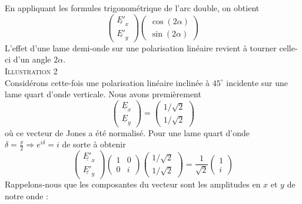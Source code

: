 		En appliquant les formules trigonométrique de l'arc double, on obtient
		\begin{equation}
		\left(\begin{array}{c}
		\underline{E'}_x\\
		\underline{E'}_y
		\end{array}\right)		\left(\begin{array}{cc}
		\cos(2\alpha)\\
		\sin(2\alpha)
		\end{array}\right)
		\end{equation}
		L'effet d'une lame demi-onde sur une polarisation linéaire revient à tourner 
		celle-ci d'un angle $2\alpha$.\\
		
		
		\textsc{Illustration 2}\ \\
		Considérons cette-fois une polarisation linéaire inclinée à $45^\circ$ incidente sur 
		une lame quart d'onde verticale. Nous avons premièrement
		\begin{equation}
		\left(\begin{array}{c}
		\underline{E}_x\\
		\underline{E}_y
		\end{array}\right) = \left(\begin{array}{c}
		1/\sqrt{2}\\
		1/\sqrt{2}
		\end{array}\right)
		\end{equation}
		où ce vecteur de Jones a été normalisé. Pour une lame quart d'onde $\delta = \frac{\pi}{2} 
		\Rightarrow e^{i\delta} =i$ de sorte à obtenir
		\begin{equation}
		\left(\begin{array}{c}
		\underline{E'}_x\\
		\underline{E'}_y
		\end{array}\right)		\left(\begin{array}{cc}
		1 & 0\\
		0 & i
		\end{array}\right)\left(\begin{array}{c}
		1/\sqrt{2}\\
		1/\sqrt{2}
		\end{array}\right) = \dfrac{1}{\sqrt{2}}\left(\begin{array}{c}
		1\\
		i
		\end{array}\right)
		\end{equation}
		Rappelons-nous que les composantes du vecteur sont les amplitudes en $x$ et $y$ de notre onde :
